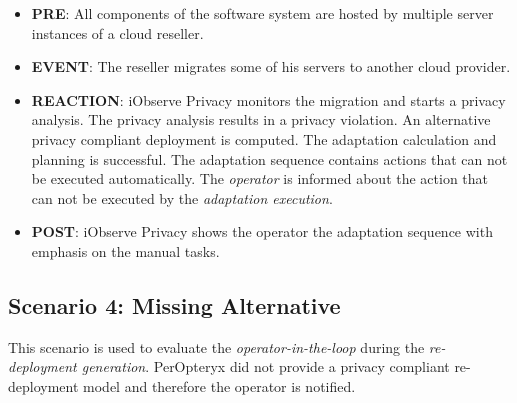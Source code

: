 \begin{itemize}
	\setlength\itemsep{0em}
	\item \textbf{PRE}: All components of the software system are hosted by multiple server instances of a cloud reseller. 
	\item \textbf{EVENT}: The reseller migrates some of his servers to another cloud provider.
	\item \textbf{REACTION}: iObserve Privacy monitors the migration and starts a privacy analysis. The privacy analysis results in a privacy violation. An alternative privacy compliant deployment is computed. The adaptation calculation and planning is successful. The adaptation sequence contains actions that can not be executed automatically. The \textit{operator} is informed about the action that can not be executed by the \textit{adaptation execution}.
	\item \textbf{POST}: iObserve Privacy shows the operator the adaptation sequence with emphasis on the manual tasks.
\end{itemize}


\subsection{Scenario 4: Missing Alternative}
\label{eval:scenario:4}

This scenario is used to evaluate the \textit{operator-in-the-loop} during the \textit{re-deployment generation}. PerOpteryx did not provide a privacy compliant re-deployment model and therefore the operator is notified.

